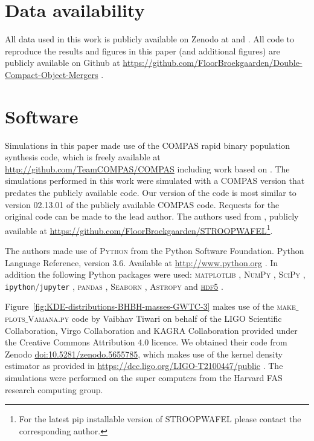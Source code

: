 \documentclass[fleqn,usenatbib]{mnras}
\begin{document}
\section*{Data availability}
\label{sec:data-availability}
All data used in this work is publicly available on Zenodo at \citet[][BHBH]{Broekgaarden:2021-zenodo-BHBH} \citet[][BHNS]{Broekgaarden:2021-zenodo-BHNS} and  \citet[][NSNS]{Broekgaarden:2021-zenodo-NSNS}. All code to reproduce the results and figures in this paper (and additional figures) are publicly available on Github at \url{https://github.com/FloorBroekgaarden/Double-Compact-Object-Mergers} \href{https://github.com/FloorBroekgaarden/Double-Compact-Object-Mergers}{\faGithub}. 



\section*{Software} 
Simulations in this paper made use of the COMPAS rapid binary population synthesis code, which is freely available at \url{http://github.com/TeamCOMPAS/COMPAS} \citep{COMPAS:2021methodsPaper} including work based on  \citep{stevenson2017formation, 2018MNRAS.477.4685B, VignaGomez:2018,Broekgaarden:2019}. 
The simulations performed in this work were simulated with a COMPAS version that predates the publicly available code. Our version of the code is most similar to version 02.13.01 of the publicly available COMPAS code. 
Requests for the original code can be made to the lead author. 
The authors used {} from \citep{Broekgaarden:2019}, publicly available at \url{https://github.com/FloorBroekgaarden/STROOPWAFEL}\footnote{For the latest pip installable version of STROOPWAFEL please contact the corresponding author.}.

The authors made use of \textsc{Python} from the  Python Software Foundation. Python Language Reference, version 3.6. Available at \url{http://www.python.org} \citep{CS-R9526}. In addition the following Python packages were used: \textsc{matplotlib} \citep{2007CSE.....9...90H},  \textsc{NumPy} \citep{2020NumPy-Array}, \textsc{SciPy} \citep{2020SciPy-NMeth}, \texttt{ipython$/$jupyter} \citep{2007CSE.....9c..21P, kluyver2016jupyter}, \textsc{pandas} \citep{mckinney-proc-scipy-2010}, \textsc{Seaborn} \citep{waskom2020seaborn}, \textsc{Astropy} \citep{2018AJ....156..123A}  and   \href{https://docs.h5py.org/en/stable/}{\textsc{hdf5}} \citep{collette_python_hdf5_2014}. 

Figure~\ref{fig:KDE-distributions-BHBH-masses-GWTC-3} makes use of the \textsc{make$\_$plots$\_$Vamana.py} code by Vaibhav Tiwari on behalf of the LIGO Scientific Collaboration, Virgo Collaboration and KAGRA Collaboration provided under the Creative Commons Attribution 4.0 licence. We obtained their code from Zenodo \url{doi:10.5281/zenodo.5655785}, which makes use of the kernel density estimator as provided in \url{https://dcc.ligo.org/LIGO-T2100447/public} \citep{Sadiq:2021kde}. 
The simulations were performed on the super computers from the Harvard FAS research computing group. 
\end{document}

